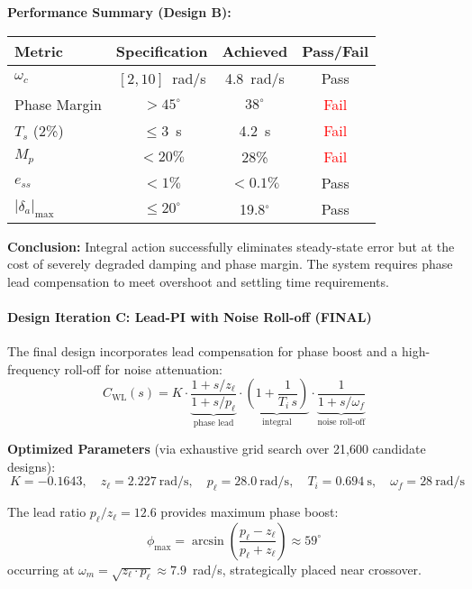 \textbf{Performance Summary (Design B):}
\begin{center}
\begin{tabular}{lccc}
\hline
\textbf{Metric} & \textbf{Specification} & \textbf{Achieved} & \textbf{Pass/Fail} \\
\hline
$\omega_c$ & $[2,10]$~rad/s & 4.8~rad/s & \textcolor{green!60!black}{Pass} \\
Phase Margin & $>45^\circ$ & $38^\circ$ & \textcolor{red}{Fail} \\
$T_s$ (2\%) & $\le 3$~s & 4.2~s & \textcolor{red}{Fail} \\
$M_p$ & $<20\%$ & 28\% & \textcolor{red}{Fail} \\
$e_{ss}$ & $<1\%$ & $<0.1\%$ & \textcolor{green!60!black}{Pass} \\
$|\delta_a|_{\max}$ & $\le 20^\circ$ & 19.8$^\circ$ & \textcolor{green!60!black}{Pass} \\
\hline
\end{tabular}
\end{center}

\textbf{Conclusion:} Integral action successfully eliminates steady-state error but at the cost of severely degraded damping and phase margin. The system requires phase lead compensation to meet overshoot and settling time requirements.

\paragraph{Design Iteration C: Lead-PI with Noise Roll-off (FINAL)}

The final design incorporates lead compensation for phase boost and a high-frequency roll-off for noise attenuation:
\begin{equation}
C_{\mathrm{WL}}(s) = K \cdot \underbrace{\frac{1 + s/z_\ell}{1 + s/p_\ell}}_{\text{phase lead}} \cdot \underbrace{\left(1 + \frac{1}{T_i\,s}\right)}_{\text{integral}} \cdot \underbrace{\frac{1}{1 + s/\omega_f}}_{\text{noise roll-off}}
\label{eq:design_C}
\end{equation}

\textbf{Optimized Parameters} (via exhaustive grid search over 21,600 candidate designs):
\begin{equation}
\boxed{~
K = -0.1643,\quad
z_\ell = 2.227~\text{rad/s},\quad
p_\ell = 28.0~\text{rad/s},\quad
T_i = 0.694~\text{s},\quad
\omega_f = 28~\text{rad/s}
~}
\label{eq:final_params}
\end{equation}

The lead ratio $p_\ell/z_\ell = 12.6$ provides maximum phase boost:
\[
\phi_{\max} = \arcsin\left(\frac{p_\ell - z_\ell}{p_\ell + z_\ell}\right) \approx 59^\circ
\]
occurring at $\omega_m = \sqrt{z_\ell \cdot p_\ell} \approx 7.9$~rad/s, strategically placed near crossover.

